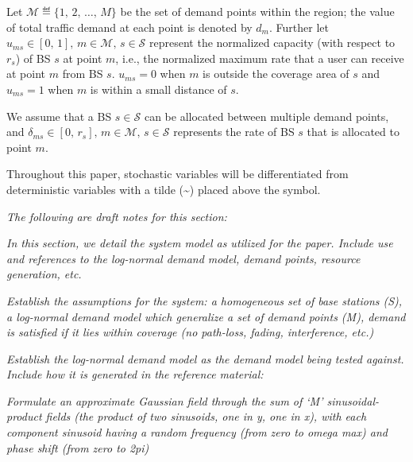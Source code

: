 \documentclass[12pt,onecolumn]{IEEEtran}
\begin{document}
Let $ \mathcal{M} \eqdef \{1,\, 2,\, \ldots,\, M\} $ be the set of demand points within the region; the value of total traffic demand at each point is denoted by $d_m$.  Further let $ u_{ms} \in [0,\, 1],\, m \in \mathcal{M},\, s \in \mathcal{S} $ represent the normalized capacity (with respect to $r_s$) of BS $s$ at point $m$, i.e., the normalized maximum rate that a user can receive at point $m$ from BS $s$.  $u_{ms} = 0$ when $m$ is outside the coverage area of $s$ and $u_{ms} = 1$ when $m$ is within a small distance of $s$.%


We assume that a BS $s \in \mathcal{S}$ can be allocated between multiple demand points, and $\delta_{ms} \in [0,\, r_s],\, m \in \mathcal{M},\, s \in \mathcal{S}$ represents the rate of BS $s$ that is allocated to point $m$.

Throughout this paper, stochastic variables will be differentiated from deterministic variables with a tilde (\textasciitilde) placed above the symbol.

\iffalse
\noindent {\color{red} \rule{\linewidth}{0.5mm}}

\textit{The following are draft notes for this section:}

\textit{In this section, we detail the system model as utilized for the paper.  Include use and references to the log-normal demand model, demand points, resource generation, etc.}

\textit{Establish the assumptions for the system: a homogeneous set of base stations (S), a log-normal demand model which generalize a set of demand points (M), demand is satisfied if it lies within coverage (no path-loss, fading, interference, etc.)}

\textit{Establish the log-normal demand model as the demand model being tested against.  Include how it is generated in the reference material:}

\textit{Formulate an approximate Gaussian field through the sum of `M' sinusoidal-product fields (the product of two sinusoids, one in y, one in x), with each component sinusoid having a random frequency (from zero to omega max) and phase shift (from zero to 2pi)}
		
\end{document}
